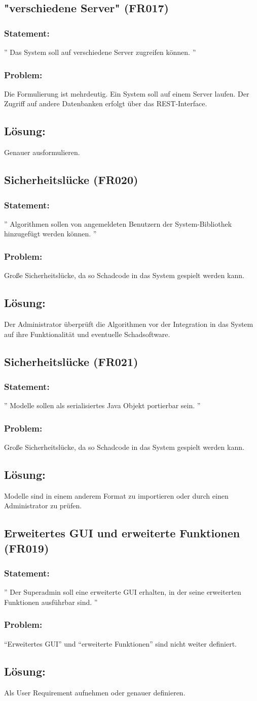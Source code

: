\documentclass{article}
\newcommand{\RPS}[5]{\subsection{#1 (#2)} \subsubsection*{Statement:} ''#3'' \subsubsection*{Problem:} #4 \subsection*{Lösung:} #5}
\begin{document}
\RPS{"verschiedene Server"}{FR017}{%
Das System soll auf verschiedene Server zugreifen können.%
}{%
Die Formulierung ist mehrdeutig. Ein System soll auf einem Server laufen. Der Zugriff auf andere Datenbanken erfolgt über das REST-Interface.%
}{%
Genauer ausformulieren.%
}


\RPS{Sicherheitslücke}{FR020}{%
Algorithmen sollen von angemeldeten Benutzern der System-Bibliothek hinzugefügt werden können.%
}{%
Große Sicherheitslücke, da so Schadcode in das System gespielt werden kann.%
}{%
Der Administrator überprüft die Algorithmen vor der Integration in das System auf ihre Funktionalität und eventuelle Schadsoftware.%
}

\RPS{Sicherheitslücke}{FR021}{%
Modelle sollen als serialisiertes Java Objekt portierbar sein.%
}{%
Große Sicherheitslücke, da so Schadcode in das System gespielt werden kann.%
}{%
Modelle sind in einem anderem Format zu importieren oder durch einen Administrator zu prüfen.%
}


\RPS{Erweitertes GUI und erweiterte Funktionen}{FR019}{%
Der Superadmin soll eine erweiterte GUI erhalten, in der seine erweiterten Funktionen ausführbar sind.%
}{%
"`Erweitertes GUI"' und "`erweiterte Funktionen"' sind nicht weiter definiert.%
}{%
Als User Requirement aufnehmen oder genauer definieren.%
}
\end{document}
